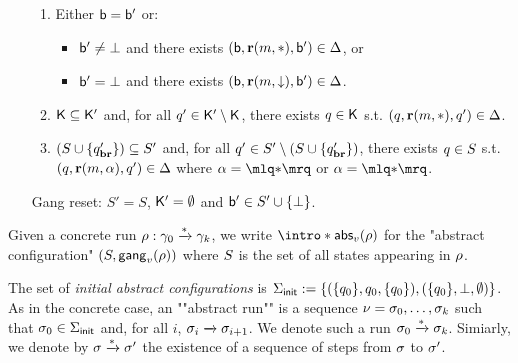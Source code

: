 \begin{definition}
\begin{enumerate}
\begin{enumerate}[label=(\roman*)]
		\item\label{item:external_broadcast_boss}Either $\mathsf{b} = \mathsf{b}'$ or:
		\begin{itemize} 
			\item $\mathsf{b}' \ne \bot$ and there exists $(\mathsf{b}, \textbf{r}(m, {*}), \mathsf{b}') \in \Delta$, or
			\item $\mathsf{b}' = \bot$ and there exists $(\mathsf{b}, \textbf{r}(m, \downarrow), \mathsf{b}') \in \Delta$.
		\end{itemize}

		\item\label{item:external_broadcast_clique}$\mathsf{K} \subseteq \mathsf{K}'$ and, for all $q' \in \mathsf{K}' \setminus \mathsf{K}$, there exists $q \in \mathsf{K}$ s.t. $(q, \textbf{r}(m, {*}), q') \in \Delta$.
		
		\item\label{item:external_broadcast_covset}$(S \cup \{q_{\textbf{br}}'\}) \subseteq S'$ and, for all $q' \in S' \setminus (S \cup \{q_{\textbf{br}}'\})$, there exists $q \in S$ s.t. $(q, \textbf{r}(m, \alpha), q') \in \Delta$ where $\anact = \quotemarks{\dummyact}$ or $\anact = \quotemarks{\dummyact}$.
	\end{enumerate}
	\item[Gang reset:] $S' = S$, $\mathsf{K}' = \emptyset$ and $\mathsf{b}' \in S' \cup \{\bot\}$. 
\end{enumerate}


Given a concrete run $\rho: \gamma_0 \xrightarrow{*} \gamma_k$, we write \AP  $\intro*\absproj{\aval}{\run}$ for the "abstract configuration" $(S, \mathsf{gang}_{v}(\rho))$ where $S$ is the set of all states appearing in $\rho$. 

The set of \emph{initial abstract configurations} is $\Sigma_{\mathsf{init}} := \{(\{q_0\}, q_0, \{q_0\}), (\{q_0\}, \bot, \emptyset)\}$.  
As in the concrete case, an ""abstract run"" is a sequence $\nu = \sigma_0, \dots, \sigma_k$ such that $\sigma_0 \in \Sigma_{\mathsf{init}}$ and, for all $i$, $\sigma_i \xrightarrow{} \sigma_{i+1}$. We denote such a run $\sigma_0 \xrightarrow{*} \sigma_k$. Simiarly, we denote by $\sigma \xrightarrow{*} \sigma'$ the existence of a sequence of steps from $\sigma$ to $\sigma'$.
\end{definition}


